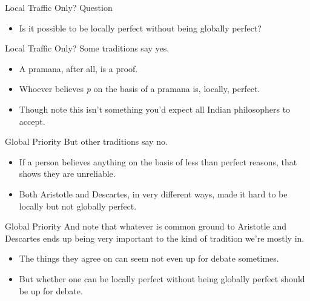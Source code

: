 \documentclass[
  17pt,
  letterpaper,
  ignorenonframetext,
  aspectratio=169,
]{beamer}
\providecommand{\tightlist}{%
  \setlength{\itemsep}{0pt}\setlength{\parskip}{0pt}}\usepackage{longtable,booktabs,array}
\begin{document}
\begin{frame}{Local Traffic Only?}
\protect\hypertarget{local-traffic-only}{}
Question

\begin{itemize}[<+->]
\tightlist
\item
  Is it possible to be locally perfect without being globally perfect?
\end{itemize}
\end{frame}

\begin{frame}{Local Traffic Only?}
\protect\hypertarget{local-traffic-only-1}{}
Some traditions say yes.

\begin{itemize}[<+->]
\tightlist
\item
  A pramana, after all, is a proof.
\item
  Whoever believes \emph{p} on the basis of a pramana is, locally,
  perfect.
\item
  Though note this isn't something you'd expect all Indian philosophers
  to accept.
\end{itemize}
\end{frame}

\begin{frame}{Global Priority}
\protect\hypertarget{global-priority}{}
But other traditions say no.

\begin{itemize}[<+->]
\tightlist
\item
  If a person believes anything on the basis of less than perfect
  reasons, that shows they are unreliable.
\item
  Both Aristotle and Descartes, in very different ways, made it hard to
  be locally but not globally perfect.
\end{itemize}
\end{frame}

\begin{frame}{Global Priority}
\protect\hypertarget{global-priority-1}{}
And note that whatever is common ground to Aristotle and Descartes ends
up being very important to the kind of tradition we're mostly in.

\begin{itemize}[<+->]
\tightlist
\item
  The things they agree on can seem not even up for debate sometimes.
\item
  But whether one can be locally perfect without being globally perfect
  should be up for debate.
\end{itemize}
\end{frame}
\end{document}
